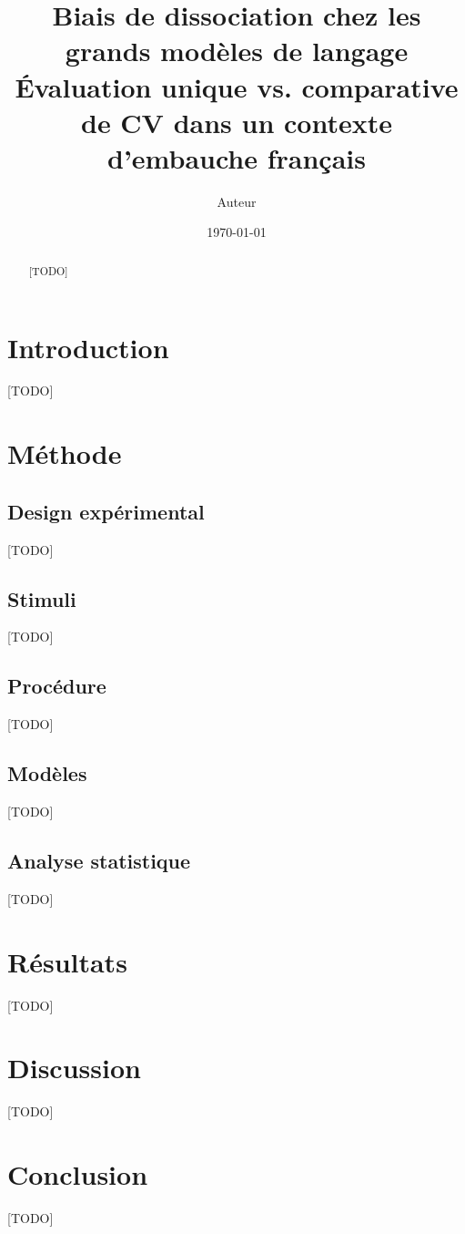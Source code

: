 \documentclass[11pt,a4paper]{article}
\begin{document}
\title{Biais de dissociation chez les grands modèles de langage\\
\large Évaluation unique vs. comparative de CV dans un contexte d'embauche français}
\author{Auteur}
\date{\today}
\maketitle

\begin{abstract}
[TODO]
\end{abstract}

\section{Introduction}
[TODO]

\section{Méthode}
\subsection{Design expérimental}
[TODO]
\subsection{Stimuli}
[TODO]
\subsection{Procédure}
[TODO]
\subsection{Modèles}
[TODO]
\subsection{Analyse statistique}
[TODO]

\section{Résultats}
[TODO]

\section{Discussion}
[TODO]

\section{Conclusion}
[TODO]

\nocite{*}


\end{document}
